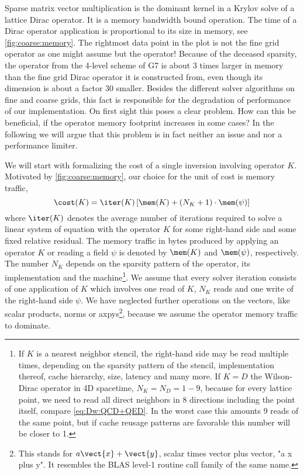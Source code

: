 Sparse matrix vector multiplication is the dominant kernel in a Krylov solve of a lattice Dirac operator.
It is a memory bandwidth bound operation.
The time of a Dirac operator application is proportional to its size in memory, see \cref{fig:coarse:memory}.
The rightmost data point in the plot is not the fine grid operator as one might assume but the  operator!
Because of the deceased sparsity, the  operator from the 4-level scheme of G7 is about \num{3} times larger in memory than the fine grid Dirac operator it is constructed from, even though its dimension is about a factor \num{30} smaller.
Besides the different solver algorithms on fine and coarse grids, this fact is responsible for the degradation of performance of our implementation.
On first sight this poses a clear problem.
How can this be beneficial, if the operator memory footprint increases in some cases?
In the following we will argue that this problem is in fact neither an issue and nor a performance limiter.

We will start with formalizing the cost of a single inversion involving operator $K$.
Motivated by \cref{fig:coarse:memory}, our choice for the unit of cost is memory traffic,
\begin{equation} \label{eq:numerics:perf:cost:single:rhs}
\cost(K) = \iter(K) \left[ \mem(K) + (N_{K} + 1) \cdot \mem(\psi) \right]
\end{equation}
where $\iter(K)$ denotes the average number of iterations required to solve a linear system of equation with the operator $K$ for some right-hand side and some fixed relative residual.
The memory traffic in bytes produced by applying an operator $K$ or reading a field $\psi$ is denoted by $\mem(K)$ and $\mem(\psi)$, respectively.
The number $N_K$ depends on the sparsity pattern of the operator, its implementation and the machine\footnote{If $K$ is a nearest neighbor stencil, the right-hand side may be read multiple times, depending on the sparsity pattern of the stencil, implementation thereof, cache hierarchy, size, latency and many more. If $K=D$ the Wilson-Dirac operator in 4D spacetime, $N_K = N_D = 1-9$, because for every lattice point, we need to read all direct neighbors in \num{8} directions including the point itself, compare \cref{eq:Dw:QCD+QED}. In the worst case this amounts \num{9} reads of the same point, but if cache reusage patterns are favorable this number will be closer to \num{1}.}.
We assume that every solver iteration consists of one application of $K$ which involves one read of $K$, $N_K$ reads and one write of the right-hand side $\psi$.
We have neglected further operations on the vectors, like scalar products, norms or axpys\footnote{This stands for $a \vect{x} + \vect{y}$, scalar times vector plus vector, "a x plus y". It resembles the BLAS level-1 routine call family of the same name.}, because we assume the operator memory traffic to dominate.

